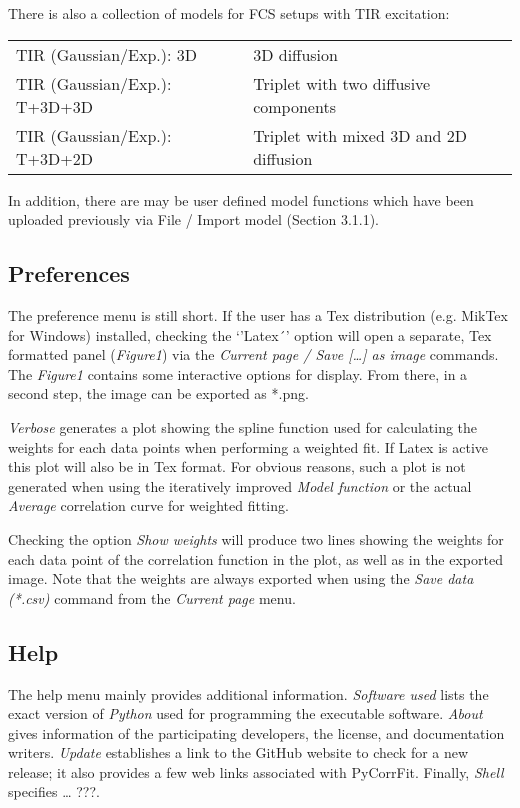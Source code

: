 There is also a collection of models for FCS setups with TIR excitation:

\begin{tabular}{l l}
TIR (Gaussian/Exp.): 3D & 3D diffusion \\
TIR (Gaussian/Exp.): T+3D+3D & Triplet with two diffusive components \\
TIR (Gaussian/Exp.): T+3D+2D & Triplet with mixed 3D and 2D diffusion \\
\end{tabular}


In addition, there are may be user defined model functions which have been uploaded previously via File / Import model (Section 3.1.1).

\subsection{Preferences}

The preference menu is still short. If the user has a Tex distribution (e.g. MikTex for Windows) installed, checking the `'Latex´' option will open a separate, Tex formatted panel (\textit{Figure1}) via the \textit{Current page / Save […] as image} commands. The \textit{Figure1} contains some interactive options for display. From there, in a second step, the image can be exported as *.png.

\textit{Verbose} generates a plot showing the spline function used for calculating the weights for each data points when performing a weighted fit. If Latex is active this plot will also be in Tex format. For obvious reasons, such a plot is not generated when using the iteratively improved \textit{Model function} or the actual \textit{Average} correlation curve for weighted fitting.

Checking the option \textit{Show weights} will produce two lines showing the weights for each data point of the correlation function in the plot, as well as in the exported image. Note that the weights are always exported when using the \textit{Save data (*.csv)} command from the \textit{Current page} menu.

\subsection{Help}

The help menu mainly provides additional information. \textit{Software used} lists the exact version of \textit{Python} used for programming the executable software. \textit{About} gives information of the participating developers, the license, and documentation writers. \textit{Update} establishes a link to the GitHub website to check for a new release; it also provides a few web links associated with PyCorrFit. Finally, \textit{Shell} specifies … ???.

